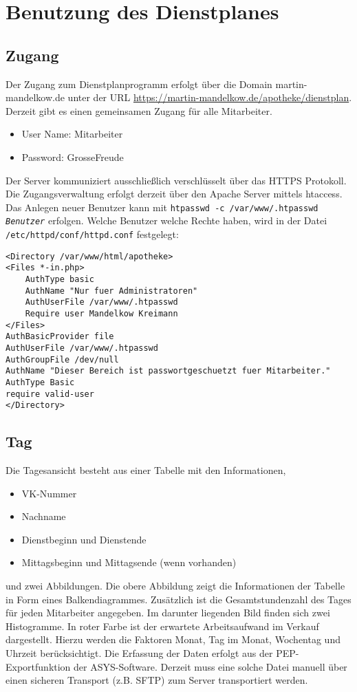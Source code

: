\documentclass[10pt,a4paper,titlepage,oneside]{article}
\begin{document}
\section{Benutzung des Dienstplanes}
\subsection{Zugang}
Der Zugang zum Dienstplanprogramm erfolgt über die Domain martin-mandelkow.de unter der URL \url{https://martin-mandelkow.de/apotheke/dienstplan}.
Derzeit gibt es einen gemeinsamen Zugang für alle Mitarbeiter.
\begin{itemize}
	\item User Name: Mitarbeiter
	\item Password: GrosseFreude
\end{itemize}

Der Server kommuniziert ausschließlich verschlüsselt über das HTTPS Protokoll.
Die Zugangsverwaltung erfolgt derzeit über den Apache Server mittels htaccess.
Das Anlegen neuer Benutzer kann mit \texttt{htpasswd -c /var/www/.htpasswd \emph{Benutzer}}
erfolgen. Welche Benutzer welche Rechte haben, wird in der Datei \texttt{/etc/httpd/conf/httpd.conf} festgelegt:
\begin{verbatim}
<Directory /var/www/html/apotheke>
<Files *-in.php>
    AuthType basic
    AuthName "Nur fuer Administratoren"
    AuthUserFile /var/www/.htpasswd
    Require user Mandelkow Kreimann
</Files>
AuthBasicProvider file
AuthUserFile /var/www/.htpasswd
AuthGroupFile /dev/null
AuthName "Dieser Bereich ist passwortgeschuetzt fuer Mitarbeiter."
AuthType Basic
require valid-user
</Directory>
\end{verbatim}


\subsection{Tag}
Die Tagesansicht besteht aus einer Tabelle mit den Informationen,
\begin{itemize}
	\item VK-Nummer
	\item Nachname
	\item Dienstbeginn und Dienstende
	\item Mittagsbeginn und Mittagsende (wenn vorhanden)
\end{itemize} 
und zwei Abbildungen. Die obere Abbildung zeigt die Informationen der Tabelle in Form eines Balkendiagrammes. Zusätzlich ist die Gesamtstundenzahl des Tages für jeden Mitarbeiter angegeben. Im darunter liegenden Bild finden sich zwei Histogramme. In roter Farbe ist der erwartete Arbeitsaufwand im Verkauf dargestellt. Hierzu werden die Faktoren Monat, Tag im Monat, Wochentag und Uhrzeit berücksichtigt. Die Erfassung der Daten erfolgt aus der PEP-Exportfunktion der ASYS-Software. Derzeit muss eine solche Datei manuell über einen sicheren Transport (z.B. SFTP) zum Server transportiert werden.
\end{document}
